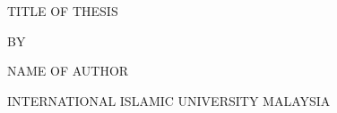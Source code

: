 \vspace{4em}
TITLE OF THESIS

BY

NAME OF AUTHOR 

INTERNATIONAL ISLAMIC UNIVERSITY MALAYSIA

\thispagestyle{empty}